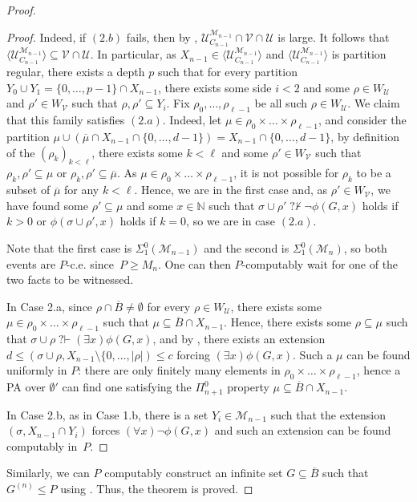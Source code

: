 \documentclass{article}
\def\NN{\mathbb{N}}
\def\U{\mathcal{U}}
\def\V{\mathcal{V}}
\def\M{\mathcal{M}}
\newcommand{\qvdash}{\operatorname{{?}{\vdash}}}
\newcommand{\nqvdash}{\operatorname{{?}{\nvdash}}}
\numberwithin{theorem}{section}
\theoremstyle{definition}
\begin{document}
\begin{proof}
\begin{proof}
Indeed, if $(2.b)$ fails, then by , $\U_{C_{n-1}}^{\M_{n-1}} \cap \V \cap \U$ is large. It follows that $\langle \U_{C_{n-1}}^{\M_{n-1}} \rangle \subseteq \V \cap \U$. In particular, as $X_{n-1} \in \langle \U_{C_{n-1}}^{\M_{n-1}} \rangle$ and $\langle \U_{C_{n-1}}^{\M_{n-1}} \rangle$ is partition regular, there exists a depth $p$ such that for every partition $Y_0 \cup Y_1 = \{0,\dots,p-1\} \cap X_{n-1}$, there exists some side $i < 2$ and some $\rho \in W_\U$ and $\rho' \in W_\V$ such that $\rho, \rho' \subseteq Y_i$. Fix $\rho_0, \dots, \rho_{\ell - 1}$ be all such $\rho \in W_\U$. We claim that this family satisfies $(2.a)$. Indeed, let $\mu \in \rho_0 \times \dots \times \rho_{\ell-1}$, and consider the partition $\mu \cup (\overline{\mu} \cap X_{n-1} \cap \{0, \dots, d-1\}) =  X_{n-1} \cap \{0, \dots, d-1\}$, by definition of the $(\rho_k)_{k < \ell}$, there exists some $k < \ell$ and some $\rho' \in W_\V$ such that $\rho_k, \rho' \subseteq \mu$ or $\rho_k, \rho' \subseteq \overline{\mu}$. As $\mu \in \rho_0 \times \dots \times \rho_{\ell-1}$, it is not possible for $\rho_k$ to be a subset of $\overline{\mu}$ for any $k < \ell$. Hence, we are in the first case and, as $\rho' \in W_\V$, we have found some $\rho' \subseteq \mu$ and some $x \in \NN$ such that $\sigma \cup \rho' \nqvdash \neg \phi(G,x)$ holds if $k > 0$ or $\phi(\sigma \cup \rho', x)$ holds if $k = 0$, so we are in case $(2.a)$.

Note that the first case is $\Sigma^0_1(\M_{n-1})$ and the second is $\Sigma^0_1(\M_n)$, so both events are $P$-c.e. since~$P \geq M_n$. One can then $P$-computably wait for one of the two facts to be witnessed.

In Case 2.a, since $\rho \cap \overline{B} \neq \emptyset$ for every $\rho \in W_\U$, there exists some $\mu \in \rho_0 \times \dots \times \rho_{\ell-1}$ such that $\mu \subseteq \overline{B} \cap X_{n-1}$. Hence, there exists some $\rho \subseteq \mu$ such that $\sigma \cup \rho \qvdash (\exists x)\phi(G,x)$, and by , there exists an extension $d \leq (\sigma \cup \rho, X_{n-1} \setminus \{0,\dots, |\rho|) \leq c$ forcing $(\exists x)\phi(G,x)$. Such a $\mu$ can be found uniformly in $P$: there are only finitely many elements in $\rho_0 \times \dots \times \rho_{\ell-1}$, hence a PA over $\emptyset'$ can find one satisfying the $\Pi_{n+1}^0$ property $\mu \subseteq \overline{B} \cap X_{n-1}$.

In Case 2.b, as in Case 1.b, there is a set $Y_i \in \M_{n-1}$ such that the extension $(\sigma, X_{n-1} \cap Y_i)$ forces $(\forall x)\neg \phi(G,x)$ and such an extension can be found computably in~$P$.

\end{proof}

Similarly, we can $P$ computably construct an infinite set $G \subseteq \overline{B}$ such that $G^{(n)} \leq P$ using . Thus, the theorem is proved.

\end{proof}
\end{document}
